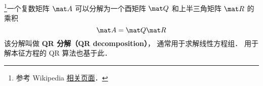 

\footnote{参考 Wikipedia \href{https://en.wikipedia.org/wiki/QR_decomposition}{相关页面}．}一个复数矩阵 $\mat A$ 可以分解为一个酉矩阵 $\mat Q$ 和上半三角矩阵 $\mat R$ 的乘积
\begin{equation}
\mat A = \mat Q\mat R
\end{equation}
该分解叫做 \textbf{QR 分解（QR decomposition）}， 通常用于求解线性方程组． 用于解本征方程的 QR 算法也基于此．

